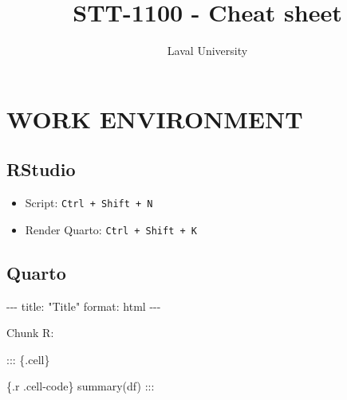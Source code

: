 \documentclass[
  8pt,
  letterpaper,
  DIV=11,
  numbers=noendperiod]{scrartcl}
\title{STT-1100 - Cheat sheet}
\author{Laval University}
\date{}
\newenvironment{Shaded}{\begin{snugshade}}{\end{snugshade}}
\newcommand{\AnnotationTok}[1]{\textcolor[rgb]{0.37,0.37,0.37}{#1}}
\newcommand{\AttributeTok}[1]{\textcolor[rgb]{0.40,0.45,0.13}{#1}}
\newcommand{\CommentTok}[1]{\textcolor[rgb]{0.37,0.37,0.37}{#1}}
\newcommand{\ConstantTok}[1]{\textcolor[rgb]{0.56,0.35,0.01}{#1}}
\newcommand{\FunctionTok}[1]{\textcolor[rgb]{0.28,0.35,0.67}{#1}}
\newcommand{\NormalTok}[1]{\textcolor[rgb]{0.00,0.23,0.31}{#1}}
\newcommand{\SpecialCharTok}[1]{\textcolor[rgb]{0.37,0.37,0.37}{#1}}
\newcommand{\StringTok}[1]{\textcolor[rgb]{0.13,0.47,0.30}{#1}}
\providecommand{\tightlist}{%
  \setlength{\itemsep}{0pt}\setlength{\parskip}{0pt}}
\begin{document}
\maketitle


\begin{Shaded}
\end{Shaded}

\section{WORK ENVIRONMENT}\label{work-environment}

\subsection{RStudio}\label{rstudio}

\begin{itemize}
\tightlist
\item
  Script: \texttt{Ctrl\ +\ Shift\ +\ N}
\item
  Render Quarto: \texttt{Ctrl\ +\ Shift\ +\ K}
\end{itemize}

\subsection{Quarto}\label{quarto}

\begin{Shaded}
\begin{Highlighting}[]
\CommentTok{{-}{-}{-}}
\AnnotationTok{title:}\CommentTok{ "Title"}
\AnnotationTok{format:}\CommentTok{ html}
\CommentTok{{-}{-}{-}}
\end{Highlighting}
\end{Shaded}

Chunk R:

\begin{Shaded}
\begin{Highlighting}[]

\SpecialCharTok{:::}\NormalTok{ \{.cell\}}

\StringTok{\textasciigrave{}\textasciigrave{}\textasciigrave{}}\AttributeTok{\{.r .cell{-}code\}}
\AttributeTok{summary(df)}
\StringTok{\textasciigrave{}\textasciigrave{}\textasciigrave{}}
\SpecialCharTok{:::}
\end{Highlighting}
\end{Shaded}
\end{document}
